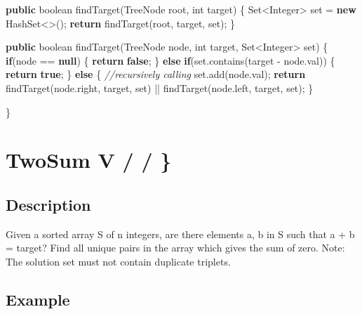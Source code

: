 \documentclass[]{book}
\newenvironment{Shaded}{\begin{snugshade}}{\end{snugshade}}
\newcommand{\BuiltInTok}[1]{#1}
\newcommand{\CommentTok}[1]{\textcolor[rgb]{0.56,0.35,0.01}{\textit{#1}}}
\newcommand{\DataTypeTok}[1]{\textcolor[rgb]{0.13,0.29,0.53}{#1}}
\newcommand{\FunctionTok}[1]{\textcolor[rgb]{0.00,0.00,0.00}{#1}}
\newcommand{\KeywordTok}[1]{\textcolor[rgb]{0.13,0.29,0.53}{\textbf{#1}}}
\newcommand{\NormalTok}[1]{#1}
\begin{document}
\begin{Shaded}
\begin{Highlighting}[]
\KeywordTok{public} \DataTypeTok{boolean} \FunctionTok{findTarget}\NormalTok{(}\BuiltInTok{TreeNode}\NormalTok{ root, }\DataTypeTok{int}\NormalTok{ target) \{}
    \BuiltInTok{Set}\NormalTok{<}\BuiltInTok{Integer}\NormalTok{> set = }\KeywordTok{new} \BuiltInTok{HashSet}\NormalTok{<>();}
    \KeywordTok{return} \FunctionTok{findTarget}\NormalTok{(root, target, set);}
\NormalTok{\}}

\KeywordTok{public} \DataTypeTok{boolean} \FunctionTok{findTarget}\NormalTok{(}\BuiltInTok{TreeNode}\NormalTok{ node, }\DataTypeTok{int}\NormalTok{ target, }\BuiltInTok{Set}\NormalTok{<}\BuiltInTok{Integer}\NormalTok{> set) \{}
    \KeywordTok{if}\NormalTok{(node == }\KeywordTok{null}\NormalTok{) \{}
        \KeywordTok{return} \KeywordTok{false}\NormalTok{;}
\NormalTok{    \} }\KeywordTok{else} \KeywordTok{if}\NormalTok{(set.}\FunctionTok{contains}\NormalTok{(target - node.}\FunctionTok{val}\NormalTok{)) \{}
        \KeywordTok{return} \KeywordTok{true}\NormalTok{;}
\NormalTok{    \} }\KeywordTok{else}\NormalTok{ \{}
        \CommentTok{//recursively calling}
\NormalTok{        set.}\FunctionTok{add}\NormalTok{(node.}\FunctionTok{val}\NormalTok{);}
        \KeywordTok{return} \FunctionTok{findTarget}\NormalTok{(node.}\FunctionTok{right}\NormalTok{, target, set) || }\FunctionTok{findTarget}\NormalTok{(node.}\FunctionTok{left}\NormalTok{, target, set);}
\NormalTok{    \}}

\NormalTok{\}}
\end{Highlighting}
\end{Shaded}

\hypertarget{twosum-v}{%
\section{TwoSum V / / \}}\label{twosum-v}}

\hypertarget{description-3}{%
\subsection{Description}\label{description-3}}

Given a sorted array S of n integers, are there elements a, b in S such that a + b = target? Find all unique
pairs in the array which gives the sum of zero. Note: The solution set must not contain duplicate triplets.

\hypertarget{example-2}{%
\subsection{Example}\label{example-2}}
\end{document}
